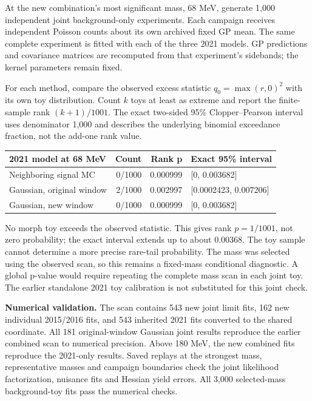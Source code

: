 \documentclass[11pt]{article}
\begin{document}
At the new combination's most significant mass, 68 MeV, generate 1,000 independent joint background-only experiments. Each campaign receives independent Poisson counts about its own archived fixed GP mean. The same complete experiment is fitted with each of the three 2021 models. GP predictions and covariance matrices are recomputed from that experiment's sidebands; the kernel parameters remain fixed.

For each method, compare the observed excess statistic $q_0=\max(r,0)^2$ with its own toy distribution. Count $k$ toys at least as extreme and report the finite-sample rank $(k+1)/1001$. The exact two-sided 95\% Clopper--Pearson interval uses denominator 1,000 and describes the underlying binomial exceedance fraction, not the add-one rank value.
\begin{center}\small\begin{tabular}{lrrl}\toprule
2021 model at 68 MeV & Count & Rank p & Exact 95\% interval\\\midrule
Neighboring signal MC & 0/1000 & 0.000999 & [0, 0.003682]\\
Gaussian, original window & 2/1000 & 0.002997 & [0.0002423, 0.007206]\\
Gaussian, new window & 0/1000 & 0.000999 & [0, 0.003682]\\
\bottomrule\end{tabular}\end{center}
No morph toy exceeds the observed statistic. This gives rank $p=1/1001$, not zero probability; the exact interval extends up to about 0.00368. The toy sample cannot determine a more precise rare-tail probability. The mass was selected using the observed scan, so this remains a fixed-mass conditional diagnostic. A global p-value would require repeating the complete mass scan in each joint toy. The earlier standalone 2021 toy calibration is not substituted for this joint check.

\textbf{Numerical validation.} The scan contains 543 new joint limit fits, 162 new individual 2015/2016 fits, and 543 inherited 2021 fits converted to the shared coordinate. All 181 original-window Gaussian joint results reproduce the earlier combined scan to numerical precision. Above 180 MeV, the new combined fits reproduce the 2021-only results. Saved replays at the strongest mass, representative masses and campaign boundaries check the joint likelihood factorization, nuisance fits and Hessian yield errors. All 3,000 selected-mass background-toy fits pass the numerical checks.
\end{document}
